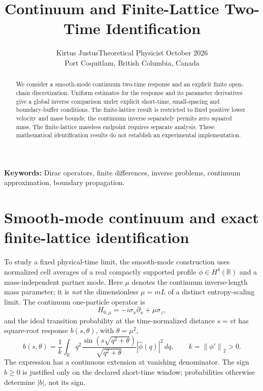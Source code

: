 \documentclass[11pt]{article}
\title{Continuum and Finite-Lattice Two-Time Identification}
\author{Kirtus Justus\enspace\textbullet\enspace Theoretical Physicist\enspace\textbullet\enspace 23 October 2026\\Port Coquitlam, British Columbia, Canada}
\date{}
\newcommand{\norm}[1]{\left\|#1\right\|}
\theoremstyle{definition}
\begin{document}
\maketitle
\begin{abstract}
We consider a smooth-mode continuum two-time response and an explicit finite open-chain discretization. Uniform estimates for the response and its parameter derivatives give a global inverse comparison under explicit short-time, small-spacing and boundary-buffer conditions. The finite-lattice result is restricted to fixed positive lower velocity and mass bounds; the continuum inverse separately permits zero squared mass. The finite-lattice massless endpoint requires separate analysis. These mathematical identification results do not establish an experimental implementation.
\end{abstract}
\noindent\textbf{Keywords:} Dirac operators, finite differences, inverse problems, continuum approximation, boundary propagation.

\section{Smooth-mode continuum and exact finite-lattice identification}
\label{sec:twotime-two-time}
To study a fixed physical-time limit, the smooth-mode construction uses
normalized cell averages of a real compactly supported profile
$\phi\in H^4(\mathbb R)$ and a mass-independent partner mode. Here
$\mu$ denotes the continuum inverse-length mass parameter; it is
\emph{not} the dimensionless $\mu=mL$ of a distinct entropy-scaling limit.
The continuum one-particle operator is
\[
 H_{0,\mu}=-i\sigma_x\partial_x+\mu\sigma_z,
\]
and the ideal transition probability at the time-normalized distance
$s=vt$ has square-root response $b(s,\theta)$, with $\theta=\mu^2$,
\begin{equation}
 b(s,\theta)=\frac1k\int_{\mathbb R} q^2
 \frac{\sin(s\sqrt{q^2+\theta})}{\sqrt{q^2+\theta}}
 |\widehat\phi(q)|^2\,dq,
 \qquad k=\norm{\phi'}_2>0.
 \label{eq:twotime-continuum-response}
\end{equation}
The expression has a continuous extension at vanishing denominator.
The sign $b\ge0$ is justified only on the declared short-time window;
probabilities otherwise determine $|b|$, not its sign.
\end{document}
